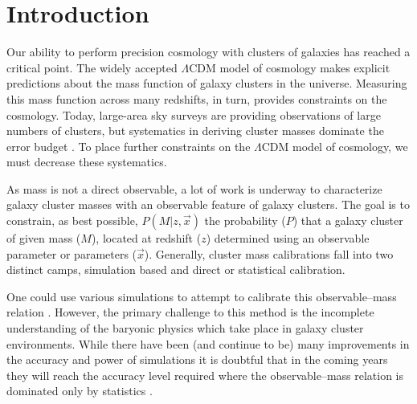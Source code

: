\documentclass[fleqn,usenatbib]{mnras}
\begin{document}
\section{Introduction}\label{sec: Introduction}
Our ability to perform precision cosmology with clusters of galaxies has reached a critical point. The widely accepted $\Lambda$CDM model of cosmology makes explicit predictions about the mass function of galaxy clusters in the universe. Measuring this mass function across many redshifts, in turn, provides constraints on the cosmology. Today, large-area sky surveys are providing observations of large numbers of clusters, but systematics in deriving cluster masses dominate the error budget . To place further constraints on the $\Lambda$CDM model of cosmology, we must decrease these systematics. 

As mass is not a direct observable, a lot of work is underway to characterize galaxy cluster masses with an observable feature of galaxy clusters. The goal is to constrain, as best possible, $P(M|z, \vec{x})$ the probability ($P$) that a galaxy cluster of given mass ($M$), located at redshift ($z$) determined using an observable parameter or parameters ($\vec{x}$). Generally, cluster mass calibrations fall into two distinct camps, simulation based and direct or statistical calibration.

One could use various simulations to attempt to calibrate this observable--mass relation . However, the primary challenge to this method is the incomplete understanding of the baryonic physics which take place in galaxy cluster environments. While there have been (and continue to be) many improvements in the accuracy and power of simulations it is doubtful that in the coming years they will reach the accuracy level required where the observable--mass relation is dominated only by statistics \citep{Weinberg2013}. 
 
\end{document}
